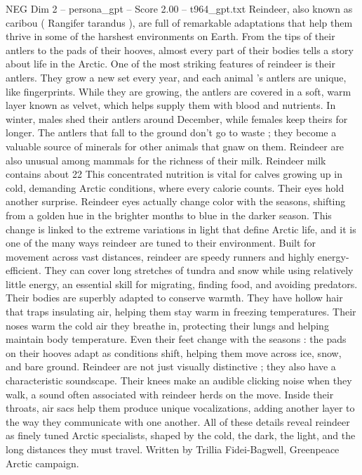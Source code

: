 \begin{textsample}{NEG Dim 2 – persona\_gpt – Score 2.00 – t964\_gpt.txt}  \label{ex:f2_neg_042}
Reindeer, also known as caribou ( Rangifer tarandus ), are full of remarkable adaptations that help them thrive in some of the harshest environments on Earth.
From the tips of their antlers to the pads of their hooves, almost every part of their bodies tells a story about life in the Arctic.
One of the most striking features of reindeer is their antlers.
They grow a new set every year, and each animal ’s antlers are unique, like fingerprints.
While they are growing, the antlers are covered in a soft, warm layer known as velvet, which helps supply them with blood and nutrients.
In winter, males shed their antlers around December, while females keep theirs for longer.
The antlers that fall to the ground don't go to waste ; they become a valuable source of minerals for other animals that gnaw on them.
Reindeer are also unusual among mammals for the richness of their milk.
Reindeer milk contains about 22 %
This concentrated nutrition is vital for calves growing up in cold, demanding Arctic conditions, where every calorie counts.
Their eyes hold another surprise.
Reindeer eyes actually change color with the seasons, shifting from a golden hue in the brighter months to blue in the darker season.
This change is linked to the extreme variations in light that define Arctic life, and it is one of the many ways reindeer are tuned to their environment.
Built for movement across vast distances, reindeer are speedy runners and highly energy-efficient.
They can cover long stretches of tundra and snow while using relatively little energy, an essential skill for migrating, finding food, and avoiding predators.
Their bodies are superbly adapted to conserve warmth.
They have hollow hair that traps insulating air, helping them stay warm in freezing temperatures.
Their noses warm the cold air they breathe in, protecting their lungs and helping maintain body temperature.
Even their feet change with the seasons : the pads on their hooves adapt as conditions shift, helping them move across ice, snow, and bare ground.
Reindeer are not just visually distinctive ; they also have a characteristic soundscape.
Their knees make an audible clicking noise when they walk, a sound often associated with reindeer herds on the move.
Inside their throats, air sacs help them produce unique vocalizations, adding another layer to the way they communicate with one another.
All of these details reveal reindeer as finely tuned Arctic specialists, shaped by the cold, the dark, the light, and the long distances they must travel.
Written by Trillia Fidei-Bagwell, Greenpeace Arctic campaign.

\end{textsample}

